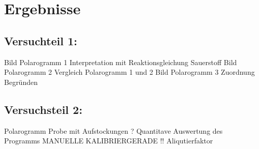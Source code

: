 \section{Ergebnisse}
\label{sec:ergebnisse}
\subsection{Versuchteil 1:}
 Bild Polarogramm 1
 Interpretation mit Reaktionsgleichung Sauerstoff
 Bild Polarogramm 2
 Vergleich Polarogramm 1 und 2 
 Bild Polarogramm 3
 Zuordnung Begründen
 
 \subsection{Versuchsteil 2:}
 Polarogramm Probe mit Aufstockungen ?
 Quantitave Auswertung des Programms
 MANUELLE KALIBRIERGERADE !!
 Aliqutierfaktor